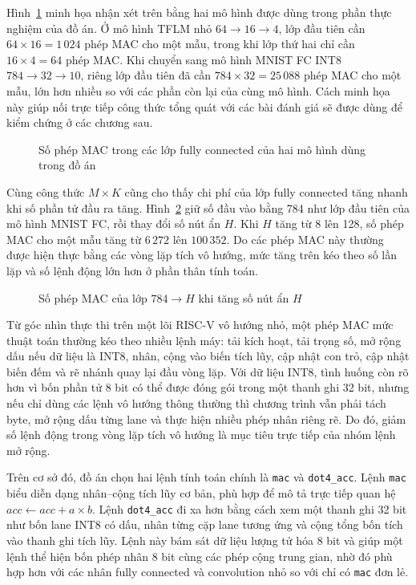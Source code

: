 \documentclass[../DoAn.tex]{subfiles}
\begin{document}
Hình~\ref{fig:fc-mac-model-layers} minh họa nhận xét trên bằng hai mô hình được dùng trong phần thực nghiệm của đồ án. Ở mô hình TFLM nhỏ \(64 \rightarrow 16 \rightarrow 4\), lớp đầu tiên cần \(64 \times 16 = 1\,024\) phép MAC cho một mẫu, trong khi lớp thứ hai chỉ cần \(16 \times 4 = 64\) phép MAC. Khi chuyển sang mô hình MNIST FC INT8 \(784 \rightarrow 32 \rightarrow 10\), riêng lớp đầu tiên đã cần \(784 \times 32 = 25\,088\) phép MAC cho một mẫu, lớn hơn nhiều so với các phần còn lại của cùng mô hình. Cách minh họa này giúp nối trực tiếp công thức tổng quát với các bài đánh giá sẽ được dùng để kiểm chứng ở các chương sau.

\begin{figure}[H]
    \centering
    
    \caption{Số phép MAC trong các lớp fully connected của hai mô hình dùng trong đồ án}
    \label{fig:fc-mac-model-layers}
\end{figure}

Cùng công thức \(M \times K\) cũng cho thấy chi phí của lớp fully connected tăng nhanh khi số phần tử đầu ra tăng. Hình~\ref{fig:fc-mac-hidden-growth} giữ số đầu vào bằng 784 như lớp đầu tiên của mô hình MNIST FC, rồi thay đổi số nút ẩn \(H\). Khi \(H\) tăng từ 8 lên 128, số phép MAC cho một mẫu tăng từ \(6\,272\) lên \(100\,352\). Do các phép MAC này thường được hiện thực bằng các vòng lặp tích vô hướng, mức tăng trên kéo theo số lần lặp và số lệnh động lớn hơn ở phần thân tính toán.

\begin{figure}[H]
    \centering
    
    \caption{Số phép MAC của lớp \(784 \rightarrow H\) khi tăng số nút ẩn \(H\)}
    \label{fig:fc-mac-hidden-growth}
\end{figure}

Từ góc nhìn thực thi trên một lõi RISC-V vô hướng nhỏ, một phép MAC mức thuật toán thường kéo theo nhiều lệnh máy: tải kích hoạt, tải trọng số, mở rộng dấu nếu dữ liệu là INT8, nhân, cộng vào biến tích lũy, cập nhật con trỏ, cập nhật biến đếm và rẽ nhánh quay lại đầu vòng lặp. Với dữ liệu INT8, tình huống còn rõ hơn vì bốn phần tử 8 bit có thể được đóng gói trong một thanh ghi 32 bit, nhưng nếu chỉ dùng các lệnh vô hướng thông thường thì chương trình vẫn phải tách byte, mở rộng dấu từng lane và thực hiện nhiều phép nhân riêng rẽ. Do đó, giảm số lệnh động trong vòng lặp tích vô hướng là mục tiêu trực tiếp của nhóm lệnh mở rộng.

Trên cơ sở đó, đồ án chọn hai lệnh tính toán chính là \texttt{mac} và \texttt{dot4\_acc}. Lệnh \texttt{mac} biểu diễn dạng nhân--cộng tích lũy cơ bản, phù hợp để mô tả trực tiếp quan hệ \(acc \leftarrow acc + a \times b\). Lệnh \texttt{dot4\_acc} đi xa hơn bằng cách xem một thanh ghi 32 bit như bốn lane INT8 có dấu, nhân từng cặp lane tương ứng và cộng tổng bốn tích vào thanh ghi tích lũy. Lệnh này bám sát dữ liệu lượng tử hóa 8 bit và giúp một lệnh thể hiện bốn phép nhân 8 bit cùng các phép cộng trung gian, nhờ đó phù hợp hơn với các nhân fully connected và convolution nhỏ so với chỉ có \texttt{mac} đơn lẻ.
\end{document}

